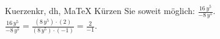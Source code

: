 \begin{MAufgabe}{Kuerzen}{kr, dh, MaTeX}
K\"urzen Sie soweit m\"oglich: $\frac{16\, y^5}{- 8\, y^5}$.\\ 
\ifLsg\MLoesung
\quad $\frac{16\, y^5}{- 8\, y^5}=\frac{(8\, y^5)\cdot(2)}{(8\, y^5)\cdot(-1)}=\frac{2}{-1}$.\else\relax\fi
 \end{MAufgabe}
